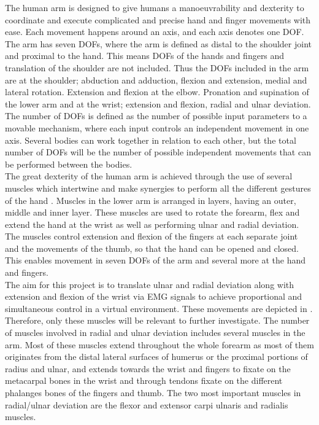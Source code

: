 The human arm is designed to give humans a manoeuvrability and dexterity to coordinate and execute complicated and precise hand and finger movements with ease. Each movement happens around an axis, and each axis denotes one DOF. The arm has seven DOFs, where the arm is defined as distal to the shoulder joint and proximal to the hand. This means DOFs of the hands and fingers and translation of the shoulder are not included. Thus the DOFs included in the arm are at the shoulder; abduction and adduction, flexion and extension, medial and lateral rotation. Extension and flexion at the elbow. Pronation and supination of the lower arm and at the wrist; extension and flexion, radial and ulnar deviation. \\
The number of DOFs is defined as the number of possible input parameters to a movable mechanism, where each input controls an independent movement in one axis. Several bodies can work together in relation to each other, but the total number of DOFs will be the number of possible independent movements that can be performed between the bodies. \cite{dicker2003} \\
The great dexterity of the human arm is achieved through the use of several muscles which intertwine and make synergies to perform all the different gestures of the hand \cite{jiang2009, avella2006}. Muscles in the lower arm is arranged in layers, having an outer, middle and inner layer. These muscles are used to rotate the forearm, flex and extend the hand at the wrist as well as performing ulnar and radial deviation. The muscles control extension and flexion of the fingers at each separate joint and the movements of the thumb, so that the hand can be opened and closed. This enables movement in seven DOFs of the arm and several more at the hand and fingers. \\
The aim for this project is to translate ulnar and radial deviation along with extension and flexion of the wrist via EMG signals to achieve proportional and simultaneous control in a virtual environment. These movements are depicted in . Therefore, only these muscles will be relevant to further investigate. The number of muscles involved in radial and ulnar deviation includes several muscles in the arm. Most of these muscles extend throughout the whole forearm as most of them originates from the distal lateral surfaces of humerus or the proximal portions of radius and ulnar, and extends towards the wrist and fingers to fixate on the metacarpal bones in the wrist and through tendons fixate on the different phalanges bones of the fingers and thumb. The two most important muscles in radial/ulnar deviation are the flexor and extensor carpi ulnaris and radialis muscles. 

